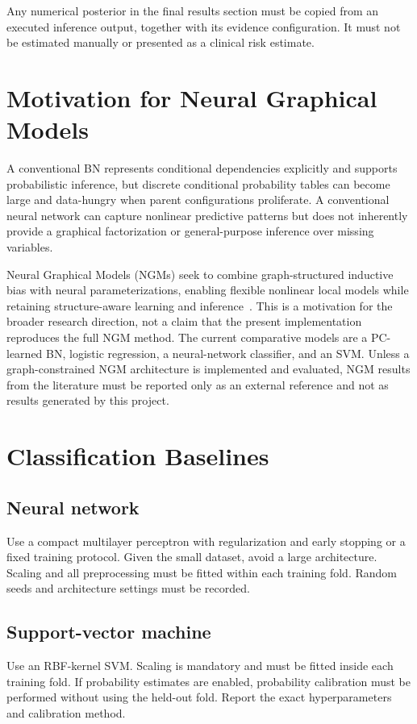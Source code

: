 \documentclass[10pt,twocolumn,letterpaper]{article}
\begin{document}
	Any numerical posterior in the final results section must be copied from an executed inference output, together with its evidence configuration. It must not be estimated manually or presented as a clinical risk estimate.

	\section{Motivation for Neural Graphical Models}
	A conventional BN represents conditional dependencies explicitly and supports probabilistic inference, but discrete conditional probability tables can become large and data-hungry when parent configurations proliferate. A conventional neural network can capture nonlinear predictive patterns but does not inherently provide a graphical factorization or general-purpose inference over missing variables.

	Neural Graphical Models (NGMs) seek to combine graph-structured inductive bias with neural parameterizations, enabling flexible nonlinear local models while retaining structure-aware learning and inference~\cite{b1}. This is a motivation for the broader research direction, not a claim that the present implementation reproduces the full NGM method. The current comparative models are a PC-learned BN, logistic regression, a neural-network classifier, and an SVM. Unless a graph-constrained NGM architecture is implemented and evaluated, NGM results from the literature must be reported only as an external reference and not as results generated by this project.

	\section{Classification Baselines}
	\subsection{Neural network}
	Use a compact multilayer perceptron with regularization and early stopping or a fixed training protocol. Given the small dataset, avoid a large architecture. Scaling and all preprocessing must be fitted within each training fold. Random seeds and architecture settings must be recorded.

	\subsection{Support-vector machine}
	Use an RBF-kernel SVM. Scaling is mandatory and must be fitted inside each training fold. If probability estimates are enabled, probability calibration must be performed without using the held-out fold. Report the exact hyperparameters and calibration method.
\end{document}
